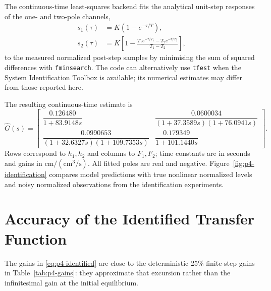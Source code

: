 The continuous-time least-squares backend fits the analytical unit-step
responses of the one- and two-pole channels,
\begin{align}
 s_1(\tau)&=K(1-e^{-\tau/T}),\\
 s_2(\tau)&=K\left[1-
 \frac{T_1e^{-\tau/T_1}-T_2e^{-\tau/T_2}}{T_1-T_2}\right],
\end{align}
to the measured normalized post-step samples by minimising the sum of
squared differences with \texttt{fminsearch}. The code can alternatively
use \texttt{tfest} when the System Identification Toolbox is available;
its numerical estimates may differ from those reported here.

The resulting continuous-time estimate is
\begin{equation}
 \widehat G(s)=\begin{bmatrix}
 \dfrac{0.126480}{1+83.9148s}&
 \dfrac{0.0600034}{(1+37.3589s)(1+76.0941s)}\\[6pt]
 \dfrac{0.0990653}{(1+32.6327s)(1+109.7353s)}&
 \dfrac{0.179349}{1+101.1440s}
 \end{bmatrix}.
 \label{eq:p4-identified}
\end{equation}
Rows correspond to $h_1,h_2$ and columns to $F_1,F_2$; time constants
are in seconds and gains in $\mathrm{cm/(cm^3/s)}$.
All fitted poles are real and negative. Figure~\ref{fig:p4-identification}
compares model predictions with true nonlinear normalized levels and
noisy normalized observations from the identification experiments.

\section{Accuracy of the Identified Transfer Function}

The gains in \eqref{eq:p4-identified} are close to the deterministic
25\% finite-step gains in Table~\ref{tab:p4-gains}: they approximate
that excursion rather than the infinitesimal gain at the initial
equilibrium.

